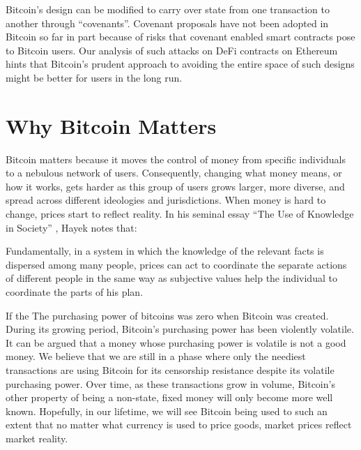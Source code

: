 Bitcoin's design can be modified to carry over state from one transaction to another through ``covenants''. Covenant proposals have not been adopted in Bitcoin so far in part because of risks that covenant enabled smart contracts pose to Bitcoin users. Our analysis of such attacks on DeFi contracts on Ethereum hints that Bitcoin's prudent approach to avoiding the entire space of such designs might be better for users in the long run.

\section{Why Bitcoin Matters}
Bitcoin matters because it moves the control of money from specific individuals to a nebulous network of users. Consequently, changing what money means, or how it works, gets harder as this group of users grows larger, more diverse, and spread across different ideologies and jurisdictions. When money is hard to change, prices start to reflect reality. In his seminal essay ``The Use of Knowledge in Society'' \cite{Hayek_AER45}, Hayek notes that:
\begin{displayquote}
Fundamentally, in a system in which the knowledge of the relevant facts is dispersed among many people, prices can act to coordinate the separate actions of different people in the same way as subjective values help the individual to coordinate the parts of his plan.
\end{displayquote}
If the The purchasing power of bitcoins was zero when Bitcoin was created. During its growing period, Bitcoin's purchasing power has been violently volatile. It can be argued that a money whose purchasing power is volatile is not a good money. We believe that we are still in a phase where only the neediest transactions are using Bitcoin for its censorship resistance despite its volatile purchasing power. Over time, as these transactions grow in volume, Bitcoin's other property of being a non-state, fixed money will only become more well known. Hopefully, in our lifetime, we will see Bitcoin being used to such an extent that no matter what currency is used to price goods, market prices reflect market reality.